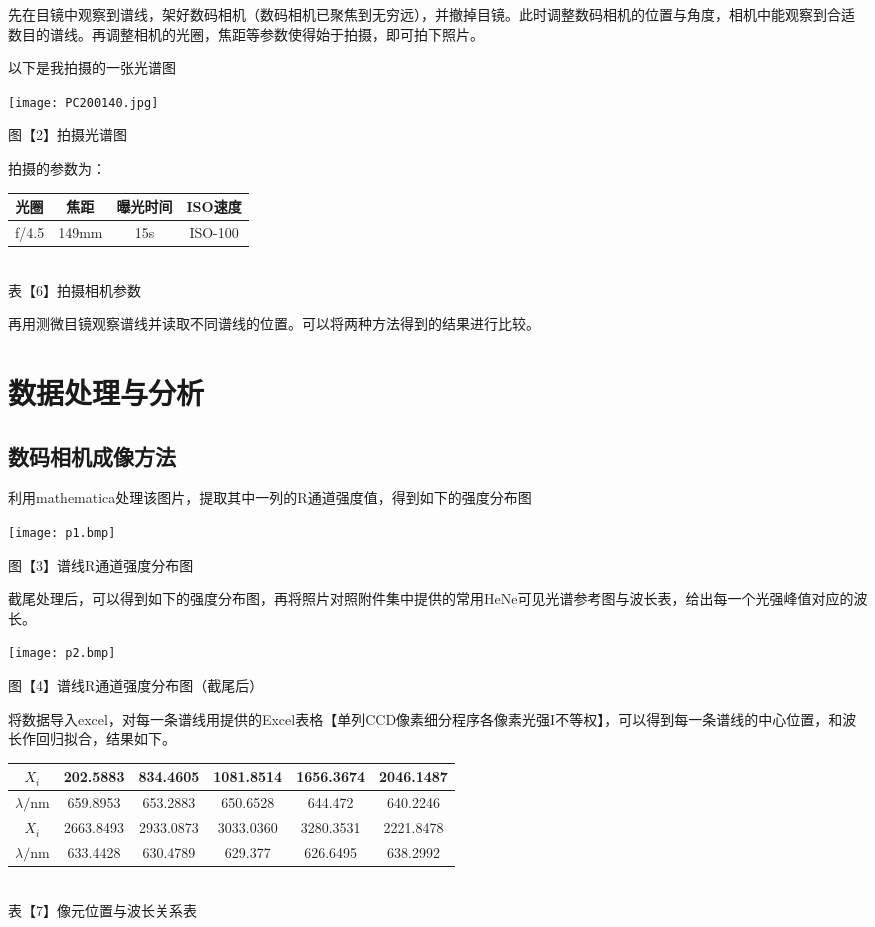 \documentclass[8pt,a4paper,nocap]{ctexart}
\begin{document}
先在目镜中观察到谱线，架好数码相机（数码相机已聚焦到无穷远），并撤掉目镜。此时调整数码相机的位置与角度，相机中能观察到合适数目的谱线。再调整相机的光圈，焦距等参数使得始于拍摄，即可拍下照片。

以下是我拍摄的一张光谱图
\begin{center}
	\texttt{[image: PC200140.jpg]}
	
	{\footnotesize 图【2】拍摄光谱图}
\end{center}
拍摄的参数为：
\begin{center}
	\begin{tabular}{|c|c|c|c|}\hline
	 光圈& 焦距 & 曝光时间& ISO速度 \\ \hline
	 f/4.5 & 149mm & 15s & ISO-100 \\ \hline
\end{tabular}\\
{\footnotesize 表【6】拍摄相机参数}
\end{center}

再用测微目镜观察谱线并读取不同谱线的位置。可以将两种方法得到的结果进行比较。
 \section{ 数据处理与分析}
 \subsection{数码相机成像方法}
 利用mathematica处理该图片，提取其中一列的R通道强度值，得到如下的强度分布图\\
 \begin{center}
 	\texttt{[image: p1.bmp]}
 	
 	{\footnotesize  图【3】谱线R通道强度分布图}
 \end{center}
 
 截尾处理后，可以得到如下的强度分布图，再将照片对照附件集中提供的常用HeNe可见光谱参考图与波长表，给出每一个光强峰值对应的波长。
 \begin{center}
 	\texttt{[image: p2.bmp]}
 	
 	{\footnotesize  图【4】谱线R通道强度分布图（截尾后）}
 \end{center}
 
 将数据导入excel，对每一条谱线用提供的Excel表格【单列CCD像素细分程序各像素光强I不等权】，可以得到每一条谱线的中心位置，和波长作回归拟合，结果如下。
\begin{center}
	 \begin{tabular}{|c|c|c|c|c|c|}\hline
 \(X_i\) & 202.5883 & 834.4605 & 1081.8514 & 1656.3674 & 2046.1487\\ \hline
\(\lambda/\mathrm{nm}\) &  659.8953 & 653.2883 & 650.6528& 644.472 & 640.2246 \\ \hline 
\(X_i\)  & 2663.8493 & 2933.0873 & 3033.0360 & 3280.3531 &  2221.8478\\ \hline
\(\lambda/\mathrm{nm}\) & 633.4428 & 630.4789 & 629.377 & 626.6495 &  638.2992\\ \hline 
 \end{tabular}\\
{\footnotesize 表【7】像元位置与波长关系表}
\end{center}
\end{document}
